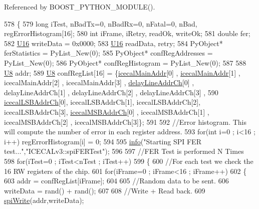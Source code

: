 Referenced by B\+O\+O\+S\+T\+\_\+\+P\+Y\+T\+H\+O\+N\+\_\+\+M\+O\+D\+U\+L\+E().


\begin{DoxyCode}
578 \{
579     \textcolor{keywordtype}{long} iTest, nBadTx=0, nBadRx=0, nFatal=0, nBad, regErrorHistogram[16];
580     \textcolor{keywordtype}{int} iFrame, iRetry, readOk, writeOk;
581     \textcolor{keywordtype}{double} fer;
582     \hyperlink{ICECALv3_8h_adf928e51a60dba0df29d615401cc55a8}{U16} writeData = 0x0000;
583     \hyperlink{ICECALv3_8h_adf928e51a60dba0df29d615401cc55a8}{U16} readData, retry;
584     PyObject* ferStatistics         = PyList\_New(0); 
585     PyObject* confRegAddresses  = PyList\_New(0);
586     PyObject* confRegHistogram  = PyList\_New(0);
587 
588     \hyperlink{ICECALv3_8h_a3cb25ca6f51f003950f9625ff05536fc}{U8}  addr;
589     \hyperlink{ICECALv3_8h_a3cb25ca6f51f003950f9625ff05536fc}{U8}  confRegList[16] = \{\hyperlink{ICECALv3_8h_a9c22ae782814495416dc2b803df326c1}{icecalMainAddr}[0] , \hyperlink{ICECALv3_8h_a9c22ae782814495416dc2b803df326c1}{icecalMainAddr}[1] , 
      icecalMainAddr[2] , icecalMainAddr[3] , \hyperlink{ICECALv3_8h_a848408b773702d268053cb49d205e097}{delayLineAddrCh}[0] , delayLineAddrCh[1] , delayLineAddrCh[2] , 
      delayLineAddrCh[3] ,
590                                                  \hyperlink{ICECALv3_8h_abd124f50fa794b9b0aded801fabf5322}{icecalLSBAddrCh}[0], icecalLSBAddrCh[1], 
      icecalLSBAddrCh[2], icecalLSBAddrCh[3], \hyperlink{ICECALv3_8h_afba64a649cc9314882fd49b62b99d6e7}{icecalMSBAddrCh}[0] , icecalMSBAddrCh[1] , 
      icecalMSBAddrCh[2] , icecalMSBAddrCh[3]\};
591 
592     \textcolor{comment}{//Error histogram. This will compute the number of error in each register address.}
593     \textcolor{keywordflow}{for}(\textcolor{keywordtype}{int} i=0 ; i<16 ; i++) regErrorHistogram[i] = 0;
594 
595     \hyperlink{classObject_a644fd329ea4cb85f54fa6846484b84a8}{info}(\textcolor{stringliteral}{"Starting SPI FER test..."},\textcolor{stringliteral}{"ICECALv3::spiFERTest"});
596 
597     \textcolor{comment}{//FER Test is performed N Times}
598     \textcolor{keywordflow}{for}(iTest=0 ; iTest<nTest ; iTest++)
599     \{
600         \textcolor{comment}{//For each test we check the 16 RW registers of the chip.}
601         \textcolor{keywordflow}{for}(iFrame=0 ; iFrame<16 ; iFrame++)
602         \{
603             addr = confRegList[iFrame];
604 
605             \textcolor{comment}{//Random data to be sent.}
606             writeData = rand() + rand();
607 
608             \textcolor{comment}{//Write + Read back.    }
609             \hyperlink{classICECALv3_aef00f02801dea4bda2093c930501dcdd}{spiWrite}(addr,writeData);

\end{DoxyCode}
